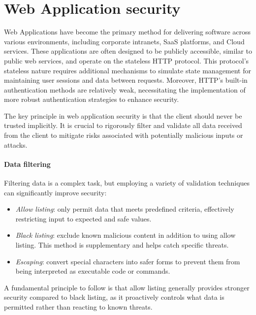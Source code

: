 \section{Web Application security}

Web Applications have become the primary method for delivering software across various environments, including corporate intranets, SaaS platforms, and Cloud services.
These applications are often designed to be publicly accessible, similar to public web services, and operate on the stateless HTTP protocol.
This protocol's stateless nature requires additional mechanisms to simulate state management for maintaining user sessions and data between requests. 
Moreover, HTTP's built-in authentication methods are relatively weak, necessitating the implementation of more robust authentication strategies to enhance security.

The key principle in web application security is that the client should never be trusted implicitly. 
It is crucial to rigorously filter and validate all data received from the client to mitigate risks associated with potentially malicious inputs or attacks.

\paragraph*{Data filtering}
Filtering data is a complex task, but employing a variety of validation techniques can significantly improve security:
\begin{itemize}
    \item \textit{Allow listing}: only permit data that meets predefined criteria, effectively restricting input to expected and safe values.
    \item \textit{Black listing}: exclude known malicious content in addition to using allow listing. This method is supplementary and helps catch specific threats.
    \item \textit{Escaping}: convert special characters into safer forms to prevent them from being interpreted as executable code or commands.
\end{itemize}
A fundamental principle to follow is that allow listing generally provides stronger security compared to black listing, as it proactively controls what data is permitted rather than reacting to known threats.